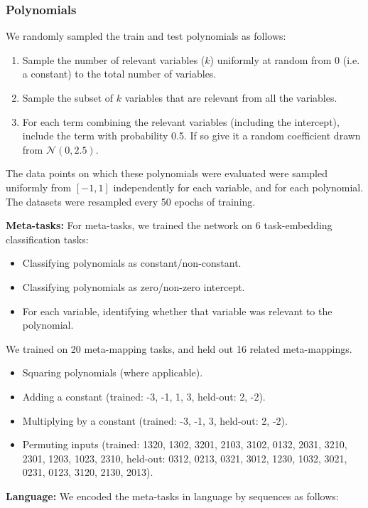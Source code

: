 \documentclass{article}
\begin{document}
\subsubsection{Polynomials} \label{meth_data_poly}
We randomly sampled the train and test polynomials as follows:
\begin{enumerate}
\item Sample the number of relevant variables ($k$) uniformly at random from 0 (i.e. a constant) to the total number of variables.
\item Sample the subset of $k$ variables that are relevant from all the variables.
\item For each term combining the relevant variables (including the intercept), include the term with probability 0.5. If so give it a random coefficient drawn from $\mathcal{N}(0, 2.5)$.
\end{enumerate}
The data points on which these polynomials were evaluated were sampled uniformly from $[-1, 1]$ independently for each variable, and for each polynomial. The datasets were resampled every 50 epochs of training. \par
\textbf{Meta-tasks:} For meta-tasks, we trained the network on 6 task-embedding classification tasks:
\begin{itemize}
\item Classifying polynomials as constant/non-constant.
\item Classifying polynomials as zero/non-zero intercept.
\item For each variable, identifying whether that variable was relevant to the polynomial.
\end{itemize}
We trained on 20 meta-mapping tasks, and held out 16 related meta-mappings.
\begin{itemize}
\item Squaring polynomials (where applicable).
\item Adding a constant (trained: -3, -1, 1, 3, held-out: 2, -2).
\item Multiplying by a constant (trained: -3, -1, 3, held-out: 2, -2).
\item Permuting inputs (trained: 1320, 1302, 3201, 2103, 3102, 0132, 2031, 3210, 2301, 1203, 1023, 2310, held-out: 0312, 0213, 0321, 3012, 1230, 1032, 3021, 0231, 0123, 3120, 2130, 2013).
\end{itemize}
\textbf{Language:} We encoded the meta-tasks in language by sequences as follows:
\end{document}
